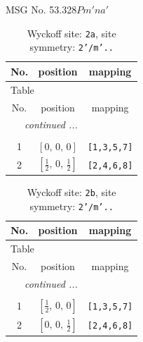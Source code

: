 \documentclass[fleqn,8pt]{jsarticle}
\begin{document}
\setcounter{MaxMatrixCols}{32}

\renewcommand{\tablename}{Table~}
\renewcommand{\figurename}{Figure~}
\begin{center}
\LARGE
MSG No. 53.328\quad$Pm'na'$
\end{center}
\renewcommand{\arraystretch}{1.2}
\begin{longtable}{ccc}
\caption{Wyckoff site: {\tt 2a}, site symmetry: {\tt 2'/m'..}}
 \\
 \hline \hline
No. & position & mapping \\ \hline \endfirsthead

\multicolumn{2}{l}{\tablename\ \thetable{}} \\
 \hline \hline
No. & position & mapping \\ \hline \endhead

 \hline \hline
\multicolumn{2}{r}{\footnotesize\it continued ...} \\ \endfoot

 \hline \hline
\multicolumn{2}{r}{} \\ \endlastfoot

1 & $\left[ 0,\, 0,\, 0 \right]$ & {\tt [1,3,5,7]} \\ \hline
2 & $\left[ \frac{1}{2},\, 0,\, \frac{1}{2} \right]$ & {\tt [2,4,6,8]} \\
\end{longtable}
\renewcommand{\arraystretch}{1.2}
\begin{longtable}{ccc}
\caption{Wyckoff site: {\tt 2b}, site symmetry: {\tt 2'/m'..}}
 \\
 \hline \hline
No. & position & mapping \\ \hline \endfirsthead

\multicolumn{2}{l}{\tablename\ \thetable{}} \\
 \hline \hline
No. & position & mapping \\ \hline \endhead

 \hline \hline
\multicolumn{2}{r}{\footnotesize\it continued ...} \\ \endfoot

 \hline \hline
\multicolumn{2}{r}{} \\ \endlastfoot

1 & $\left[ \frac{1}{2},\, 0,\, 0 \right]$ & {\tt [1,3,5,7]} \\ \hline
2 & $\left[ 0,\, 0,\, \frac{1}{2} \right]$ & {\tt [2,4,6,8]} \\
\end{longtable}
\renewcommand{\arraystretch}{1.2}
\end{document}
